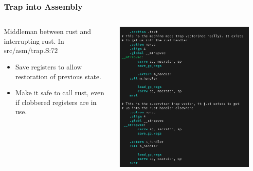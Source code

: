 \documentclass{beamer}
\begin{document}
\begin{frame}
  \frametitle{Trap into Assembly}
  \begin{columns}
    \begin{column}{0.5\textwidth}
      Middleman between rust and interrupting rust.
      In src/asm/trap.S:72
      \begin{itemize}
      \item Save registers to allow restoration of previous state.\\
      \item Make it safe to call rust, even if clobbered registers are in use.
      \end{itemize}
    \end{column}
    \begin{column}{0.5\textwidth}
      \includegraphics[width=\textwidth]{trapasm.png}
    \end{column}
  \end{columns}
\end{frame}
\end{document}
